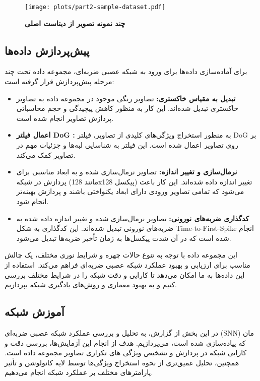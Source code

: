         \begin{figure}[!ht]
            \centering
            \texttt{[image: plots/part2-sample-dataset.pdf]} 
            \captionsetup{width=.7\linewidth}
            \caption{\textbf{چند نمونه تصویر از دیتاست اصلی} 
            }
            \label{fig:part2-sample-dataset}
        \end{figure}

        \subsection{پیش‌پردازش داده‌ها}
            برای آماده‌سازی داده‌ها برای ورود به شبکه عصبی ضربه‌ای، مجموعه داده 
            تحت چند مرحله پیش‌پردازش قرار گرفته است:
            \begin{itemize}
                \item \textbf{تبدیل به مقیاس خاکستری:} تصاویر رنگی موجود در مجموعه داده به تصاویر خاکستری تبدیل شده‌اند. این کار به منظور کاهش پیچیدگی و حجم محاسباتی پردازش تصاویر انجام شده است.
                \item \textbf{اعمال فیلتر 
                DoG :} به منظور استخراج ویژگی‌های کلیدی از تصاویر، فیلتر DoG 
                بر روی تصاویر اعمال شده است. این فیلتر به شناسایی لبه‌ها و جزئیات مهم در تصاویر کمک می‌کند.
                \item \textbf{نرمال‌سازی و تغییر اندازه:}
                 تصاویر نرمال‌سازی شده و به ابعاد مناسبی برای پردازش در شبکه 
                 (مانند 128x128 پیکسل) 
                 تغییر اندازه داده شده‌اند. این کار باعث می‌شود که تمامی تصاویر ورودی دارای ابعاد یکنواختی باشند و پردازش بهینه‌تر انجام شود.
                 \item \textbf{کدگذاری ضربه‌های نورونی:} تصاویر نرمال‌سازی شده و تغییر اندازه داده شده به ضربه‌های نورونی تبدیل شده‌اند. این کدگذاری به شکل Time-to-First-Spike 
                 انجام شده است که در آن شدت پیکسل‌ها به زمان تأخیر ضربه‌ها تبدیل می‌شود.
            \end{itemize}

        این مجموعه داده با توجه به تنوع حالات چهره و شرایط نوری مختلف، یک چالش مناسب برای ارزیابی و بهبود عملکرد شبکه عصبی ضربه‌ای فراهم می‌کند. استفاده از این داده‌ها به ما امکان می‌دهد تا کارایی و دقت شبکه را در شرایط مختلف بررسی کنیم و به بهبود معماری و روش‌های یادگیری شبکه بپردازیم.
        
        \subsection{آموزش شبکه}
            در این بخش از گزارش، به تحلیل و بررسی عملکرد شبکه عصبی ضربه‌ای 
            (SNN) مان
            که پیاده‌سازی شده است، می‌پردازیم. هدف از انجام این آزمایش‌ها، بررسی دقت و کارایی شبکه در پردازش و تشخیص ویژگی های تکراری تصاویر مجموعه داده است. همچنین، تحلیل عمیق‌تری از نحوه استخراج ویژگی‌ها توسط لایه کانولوشن و تأثیر پارامترهای مختلف بر عملکرد شبکه انجام می‌دهیم.
            
